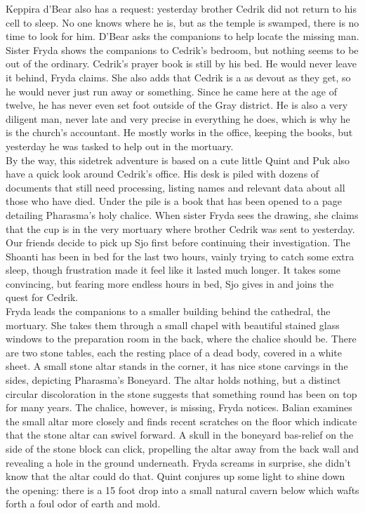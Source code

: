 Keppira d'Bear also has a request: yesterday brother Cedrik did not return to his cell to sleep. No one knows where he is, but as the temple is swamped, there is no time to look for him. D'Bear asks the companions to help locate the missing man. Sister Fryda shows the companions to Cedrik's bedroom, but nothing seems to be out of the ordinary. Cedrik's prayer book is still by his bed. He would never leave it behind, Fryda claims. She also adds that Cedrik is a as devout as they get, so he would never just run away or something. Since he came here at the age of twelve, he has never even set foot outside of the Gray district. He is also a very diligent man, never late and very precise in everything he does, which is why he is the church's accountant. He mostly works in the office, keeping the books, but yesterday he was tasked to help out in the mortuary.\\

By the way, this sidetrek adventure is based on a cute little Quint and Puk also have a quick look around Cedrik's office. His desk is piled with dozens of documents that still need processing, listing names and relevant data about all those who have died. Under the pile is a book that has been opened to a page detailing Pharasma's holy chalice. When sister Fryda sees the drawing, she claims that the cup is in the very mortuary where brother Cedrik was sent to yesterday. Our friends decide to pick up Sjo first before continuing their investigation. The Shoanti has been in bed for the last two hours, vainly trying to catch some extra sleep, though frustration made it feel like it lasted much longer. It takes some convincing, but fearing more endless hours in bed, Sjo gives in and joins the quest for Cedrik.\\

Fryda leads the companions to a smaller building behind the cathedral, the mortuary. She takes them through a small chapel with beautiful stained glass windows to the preparation room in the back, where the chalice should be. There are two stone tables, each the resting place of a dead body, covered in a white sheet. A small stone altar stands in the corner, it has nice stone carvings in the sides, depicting Pharasma's Boneyard. The altar holds nothing, but a distinct circular discoloration in the stone suggests that something round has been on top for many years. The chalice, however, is missing, Fryda notices. Balian examines the small altar more closely and finds recent scratches on the floor which indicate that the stone altar can swivel forward. A skull in the boneyard bas-relief on the side of the stone block can click, propelling the altar away from the back wall and revealing a hole in the ground underneath. Fryda screams in surprise, she didn't know that the altar could do that. Quint conjures up some light to shine down the opening: there is a 15 foot drop into a small natural cavern below which wafts forth a foul odor of earth and mold.\\

